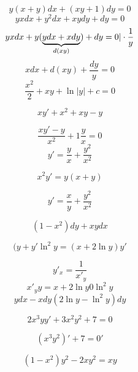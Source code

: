 \documentclass[12pt, fleqn]{article}
\begin{document}
\begin{Example}[203]
  \[y(x+y)dx + (xy+1)dy = 0\]
  \[yx dx + y^2 dx + xy dy + dy = 0\]
  \[yx dx + y(\ub{d(xy)}{y dx + x dy}) + dy = 0 | \cdot \dfrac{1}{y}\]
  \[x dx + d(xy) + \dfrac{dy}{y} = 0\]
  \[\dfrac{x^2}{2} + xy + \ln |y| + c = 0\]
\end{Example}

\begin{Example}[301]
  \[xy' + x^2 + xy - y\]
\end{Example}

\begin{Proof}
  \[\dfrac{xy' - y}{x^2} + 1 \dfrac{y}{x} = 0\]
  \[y' = \dfrac{y}{x} + \dfrac{y^2}{x^2}\]
\end{Proof}

\begin{Example}[308]
  \[x^2 y' = y(x+y)\]
\end{Example}

\begin{Proof}
  \[y' = \dfrac{x}{y} + \dfrac{y^2}{x^2}\]
\end{Proof}

\begin{Example}[309]
  \[(1-x^2)dy + xy dx\]
\end{Example}

\begin{Proof}

\end{Proof}

\begin{Example}[311]
  \[(y + y' \ln^2 y = (x+2\ln y)y'\]
\end{Example}

\begin{Proof}
  \[y'_x = \dfrac{1}{x'_y}\]
  \[x'_y y = x + 2\ln y 0 \ln^2 y\]
  \[y dx - x dy (2\ln y - \ln^2 y) dy\]
\end{Proof}

\begin{Example}[320]
  \[2x^3 y y' + 3x^2 y^2 + 7 = 0\]
\end{Example}

\begin{Proof}
  \[(x^3 y^2)' + 7 = 0'\]
\end{Proof}

\begin{Example}[330]
  \[(1-x^2)y^2 - 2xy^2 = xy\]
\end{Example}
\end{document}
